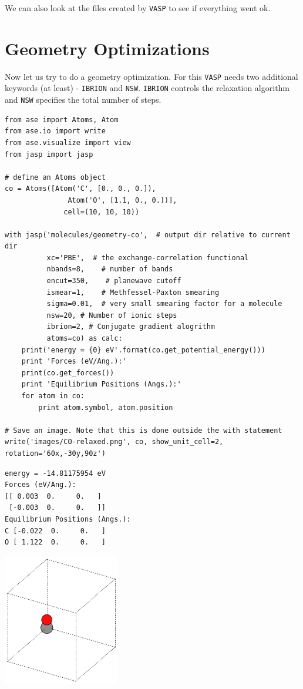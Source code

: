 \documentclass[11pt]{article}
\begin{document}
We can also look at the files created by \texttt{VASP} to see if everything went ok. 



\section{Geometry Optimizations}
\label{sec-6}

Now let us try to do a geometry optimization. For this \texttt{VASP} needs two additional keywords (at least) - \verb~IBRION~ and \verb~NSW~. \verb~IBRION~ controls the relaxation algorithm and \verb~NSW~ specifies the total number of steps.

\begin{verbatim}
from ase import Atoms, Atom
from ase.io import write
from ase.visualize import view
from jasp import jasp

# define an Atoms object
co = Atoms([Atom('C', [0., 0., 0.]),
               Atom('O', [1.1, 0., 0.])],
              cell=(10, 10, 10))

with jasp('molecules/geometry-co',  # output dir relative to current dir
          xc='PBE',  # the exchange-correlation functional
          nbands=8,    # number of bands
          encut=350,    # planewave cutoff
          ismear=1,    # Methfessel-Paxton smearing
          sigma=0.01,  # very small smearing factor for a molecule
          nsw=20, # Number of ionic steps
          ibrion=2, # Conjugate gradient alogrithm
          atoms=co) as calc:
    print('energy = {0} eV'.format(co.get_potential_energy()))
    print 'Forces (eV/Ang.):'
    print(co.get_forces())
    print 'Equilibrium Positions (Angs.):'
    for atom in co:
        print atom.symbol, atom.position
    
# Save an image. Note that this is done outside the with statement
write('images/CO-relaxed.png', co, show_unit_cell=2, rotation='60x,-30y,90z')
\end{verbatim}

\begin{verbatim}
energy = -14.81175954 eV
Forces (eV/Ang.):
[[ 0.003  0.     0.   ]
 [-0.003  0.     0.   ]]
Equilibrium Positions (Angs.):
C [-0.022  0.     0.   ]
O [ 1.122  0.     0.   ]
\end{verbatim}

\includegraphics[width=2in]{./images/CO-relaxed.png}
\end{document}
